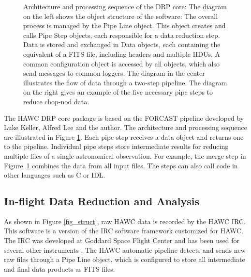 \begin{figure}[!ht]
\caption{Architecture and processing sequence of the DRP core: The diagram on the left shows the object structure of the software: The overall process is managed by the Pipe Line object. This object creates and calls Pipe Step objects, each responsible for a data reduction step. Data is stored and exchanged in Data objects, each containing the equivalent of a FITS file, including headers and multiple HDUs. A common configuration object is accessed by all objects, which also send messages to common loggers. The diagram in the center illustrates the flow of data through a two-step pipeline. The diagram on the right gives an example of the five necessary pipe steps to reduce chop-nod data.}

\label{fig_core}
\end{figure}

The HAWC DRP core package is based on the FORCAST pipeline developed by Luke Keller, Alfred Lee and the author. The architecture and processing sequence are illustrated in Figure \ref{fig_core}. Each pipe step receives a data object and returns one to the pipeline. Individual pipe steps store
intermediate results for reducing multiple files of a single astronomical observation. For example, the merge step in Figure~\ref{fig_core} combines the data from all input files. The steps can also call code in other languages such as C or IDL.

\subsection{In-flight Data Reduction and Analysis}

As shown in Figure \ref{fig_struct}, raw HAWC data is recorded by the HAWC IRC. This software is a version of the IRC software framework customized for HAWC. The IRC was developed at Goddard Space Flight Center and has been used for several other instruments \citep[see][]{staguhn06}. The HAWC automatic pipeline detects and sends new raw files through a Pipe Line object, which is configured to store all intermediate and final data products as FITS files.

